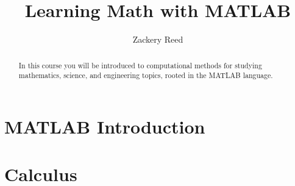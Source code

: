 \documentclass{xourse}
\title{Learning Math with MATLAB}
\author{Zackery Reed}
\begin{document}
\begin{abstract}
    In this course you will be introduced to computational methods for studying mathematics, science, and engineering topics, rooted in the MATLAB language.
\end{abstract}
\maketitle

\part{MATLAB Introduction}



\part{Calculus}
\end{document}
